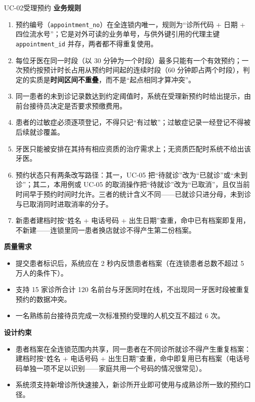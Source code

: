 \documentclass[11pt,a4paper]{ctexart}
\begin{document}
\begin{ucbox}{UC-02\quad 受理预约}
\vspace{2pt}
\textbf{业务规则}
\begin{enumerate}[leftmargin=1.9em,topsep=2pt,itemsep=1pt]
  \item 预约编号（\texttt{appointment\_no}）在全连锁内唯一，规则为“诊所代码 + 日期 + 四位流水号”；它是对外可读的业务单号，与供外键引用的代理主键 \texttt{appointment\_id} 并存，两者都不得重复使用。
  \item 每位牙医在同一时段（以 30 分钟为一个时段）最多只能有一个有效预约；一次预约按预计时长占用从预约时间起的连续时段（60 分钟即占两个时段），判定的实质是\textbf{时间区间不重叠}，而不是“起点相同才算冲突”。
  \item 同一患者的未到诊记录数达到约定阈值时，系统在受理新预约时给出提示，由前台接待员决定是否要求预缴费用。
  \item 患者的过敏症必须逐项登记，不得只记“有过敏”；过敏症记录一经登记不得被后续就诊覆盖。
  \item 牙医只能被安排在其持有相应资质的治疗需求上；无资质匹配时系统不给出该牙医。
  \item 预约状态只有两条改写路径：其一，UC-05 把“待就诊”改为“已就诊”或“未到诊”；其二，本用例或 UC-05 的取消操作把“待就诊”改为“已取消”，且仅当前时间早于预约时间时允许。三者的统计含义不同——已就诊只进分母，未到诊与已取消同时进取消率的分子。
  \item 新患者建档时按“姓名 + 电话号码 + 出生日期”查重，命中已有档案即复用，不新建——连锁里同一患者换店就诊不得产生第二份档案。
\end{enumerate}

\vspace{2pt}
\textbf{质量需求}
\begin{itemize}[leftmargin=1.4em,topsep=2pt,itemsep=1pt]
  \item 提交患者标识后，系统应在 2 秒内反馈患者档案（在连锁患者总数不超过 5 万人的条件下）。
  \item 支持 15 家诊所合计 120 名前台与牙医同时在线，不出现同一牙医时段被重复预约的数据冲突。
  \item 一名熟练前台接待员完成一次标准预约受理的人机交互不超过 6 次。
\end{itemize}

\vspace{2pt}
\textbf{设计约束}
\begin{itemize}[leftmargin=1.4em,topsep=2pt,itemsep=1pt]
  \item 患者档案在全连锁范围内共享，同一患者在不同诊所就诊不得产生重复档案：建档时按“姓名 + 电话号码 + 出生日期”查重，命中即复用已有档案（电话号码单独一项不足以识别——家庭共用一个号码的情况很常见）。
  \item 系统须支持新增诊所快速接入，新诊所开业即可使用与成熟诊所一致的预约口径。
\end{itemize}
\end{ucbox}
\end{document}

